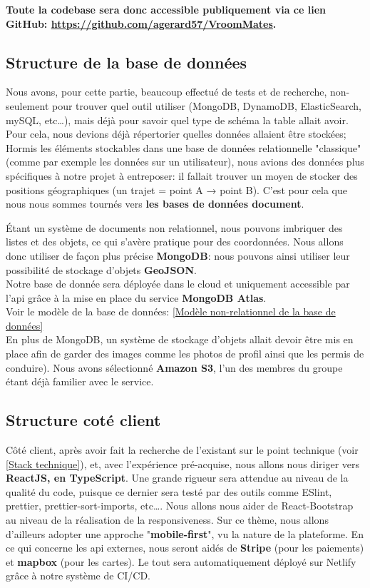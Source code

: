 \textbf{Toute la codebase sera donc accessible publiquement via ce lien GitHub: \href{https://github.com/agerard57/VroomMates}{https://github.com/agerard57/VroomMates}.}


\subsection{Structure de la base de données}

Nous avons, pour cette partie, beaucoup effectué de tests et de recherche, non-seulement pour trouver quel outil utiliser (MongoDB, DynamoDB, ElasticSearch, mySQL, etc…), mais déjà pour savoir quel type de schéma la table allait avoir.
Pour cela, nous devions déjà répertorier quelles données allaient être stockées;
Hormis les éléments stockables dans une base de données relationnelle "classique" (comme par exemple les données sur un utilisateur), nous avions des données plus spécifiques à notre projet à entreposer: il fallait trouver un moyen de stocker des positions géographiques (un trajet = point A → point B). C'est pour cela que nous nous sommes tournés vers \textbf{les bases de données document}.

Étant un système de documents non relationnel, nous pouvons imbriquer des listes et des objets, ce qui s'avère pratique pour des coordonnées. 
Nous allons donc utiliser de façon plus précise \textbf{MongoDB}: nous pouvons ainsi utiliser leur possibilité de stockage d'objets \textbf{GeoJSON}\parencite[]{Ref2}.\\ Notre base de donnée sera déployée dans le cloud et uniquement accessible par l'api grâce à la mise en place du service \textbf{MongoDB Atlas}.\\

Voir le modèle de la base de données: \ref{Modèle non-relationnel de la base de données}\\

En plus de MongoDB, un système de stockage d'objets allait devoir être mis en place afin de garder des images comme les photos de profil ainsi que les permis de conduire). Nous avons sélectionné \textbf{Amazon S3}, l'un des membres du groupe étant déjà familier avec le service.


\subsection{Structure coté client}

Côté client, après avoir fait la recherche de l'existant sur le point technique (voir \ref{Stack technique}), et, avec l'expérience pré-acquise, nous allons nous diriger vers \textbf{ReactJS, en TypeScript}. Une grande rigueur sera attendue au niveau de la qualité du code, puisque ce dernier sera testé par des outils comme ESlint, prettier, prettier-sort-imports, etc…. Nous allons nous aider de React-Bootstrap au niveau de la réalisation de la responsiveness.
Sur ce thème, nous allons d'ailleurs adopter une approche "\textbf{mobile-first}", vu la nature de la plateforme.
En ce qui concerne les api externes, nous seront aidés de \textbf{Stripe} (pour les paiements) et \textbf{mapbox} (pour les cartes). Le tout sera automatiquement déployé sur Netlify grâce à notre système de CI/CD. 

